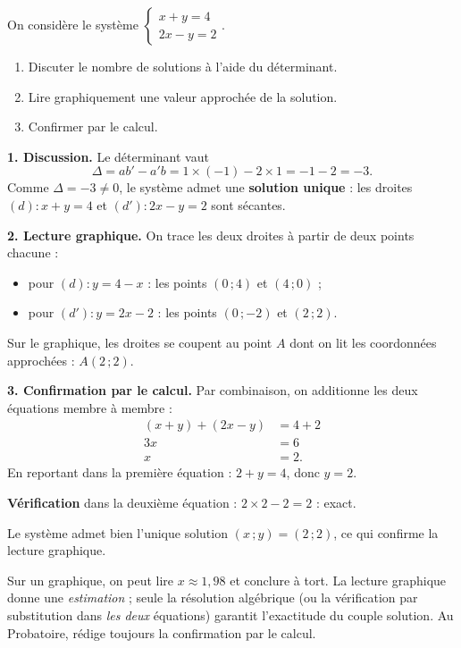 \documentclass[11pt]{article}
\begin{document}
\begin{exoresolu}
On considère le système $\begin{cases} x+y=4 \\ 2x-y=2 \end{cases}$.
\begin{enumerate}
\item Discuter le nombre de solutions à l'aide du déterminant.
\item Lire graphiquement une valeur approchée de la solution.
\item Confirmer par le calcul.
\end{enumerate}
\tcblower
\textbf{1. Discussion.} Le déterminant vaut
\[
\Delta = ab'-a'b = 1\times(-1)-2\times 1 = -1-2 = -3.
\]
Comme $\Delta=-3\neq 0$, le système admet une \textbf{solution unique} : les droites $(d):x+y=4$ et $(d'):2x-y=2$ sont sécantes.

\textbf{2. Lecture graphique.} On trace les deux droites à partir de deux points chacune :
\begin{itemize}
\item pour $(d):y=4-x$ : les points $(0\,;4)$ et $(4\,;0)$ ;
\item pour $(d'):y=2x-2$ : les points $(0\,;-2)$ et $(2\,;2)$.
\end{itemize}
Sur le graphique, les droites se coupent au point $A$ dont on lit les coordonnées approchées : $A(2\,;2)$.

\textbf{3. Confirmation par le calcul.} Par combinaison, on additionne les deux équations membre à membre :
\begin{align*}
(x+y)+(2x-y) &= 4+2 \\
3x &= 6 \\
x &= 2.
\end{align*}
En reportant dans la première équation : $2+y=4$, donc $y=2$.

\textbf{Vérification} dans la deuxième équation : $2\times 2-2=2$ : exact.

Le système admet bien l'unique solution $\boxed{(x\,;y)=(2\,;2)}$, ce qui confirme la lecture graphique.
\end{exoresolu}

\begin{attention}
Sur un graphique, on peut lire $x\approx 1{,}98$ et conclure à tort. La lecture graphique donne une \emph{estimation} ; seule la résolution algébrique (ou la vérification par substitution dans \emph{les deux} équations) garantit l'exactitude du couple solution. Au Probatoire, rédige toujours la confirmation par le calcul.
\end{attention}
\end{document}
